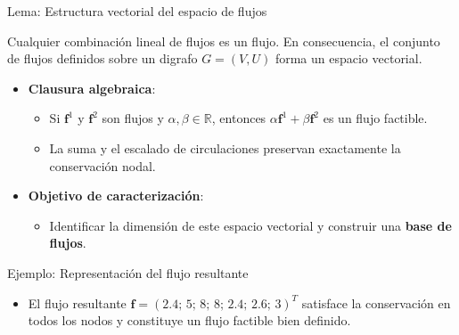 \documentclass[
  ignorenonframetext,
]{beamer}
\providecommand{\tightlist}{%
  \setlength{\itemsep}{0pt}\setlength{\parskip}{0pt}}
\begin{document}
\begin{frame}{Lema: Estructura vectorial del espacio de flujos}
\label{lema-estructura-vectorial-del-espacio-de-flujos}
\begin{tcolorbox}[enhanced jigsaw, opacityback=0, breakable, title=\textcolor{quarto-callout-note-color}{\faInfo}\hspace{0.5em}{Estructura vectorial del espacio de flujos}, colback=white, colbacktitle=quarto-callout-note-color!10!white, bottomrule=.15mm, opacitybacktitle=0.6, coltitle=black, bottomtitle=1mm, leftrule=.75mm, colframe=quarto-callout-note-color-frame, toptitle=1mm, titlerule=0mm, rightrule=.15mm, left=2mm, arc=.35mm, toprule=.15mm]

Cualquier combinación lineal de flujos es un flujo. En consecuencia, el
conjunto de flujos definidos sobre un digrafo \(G = (V, U)\) forma un
espacio vectorial.

\end{tcolorbox}

\begin{itemize}
\tightlist
\item
  \textbf{Clausura algebraica}:

  \begin{itemize}
  \tightlist
  \item
    Si \(\mathbf{f}^1\) y \(\mathbf{f}^2\) son flujos y
    \(\alpha, \beta \in \mathbb{R}\), entonces
    \(\alpha \mathbf{f}^1 + \beta \mathbf{f}^2\) es un flujo factible.
  \item
    La suma y el escalado de circulaciones preservan exactamente la
    conservación nodal.
  \end{itemize}
\item
  \textbf{Objetivo de caracterización}:

  \begin{itemize}
  \tightlist
  \item
    Identificar la dimensión de este espacio vectorial y construir una
    \textbf{base de flujos}.
  \end{itemize}
\end{itemize}
\end{frame}

\begin{frame}{Ejemplo: Representación del flujo resultante}
\label{ejemplo-representaciuxf3n-del-flujo-resultante}
\begin{itemize}
\tightlist
\item
  El flujo resultante
  \(\mathbf{f} = (2.4;\, 5;\, 8;\, 8;\, 2.4;\, 2.6;\, 3)^T\) satisface
  la conservación en todos los nodos y constituye un flujo factible bien
  definido.
\end{itemize}
\end{frame}
\end{document}
